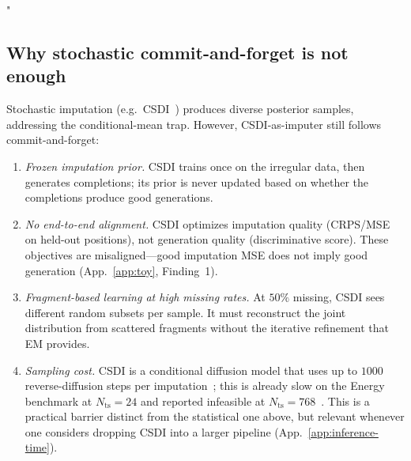 "\documentclass{article}
\theoremstyle{plain}
\theoremstyle{definition}
\theoremstyle{remark}
\newcommand{\Nts}{N_{\mathrm{ts}}}
\begin{document}
\subsection{Why stochastic commit-and-forget is not enough}
\label{app:frozen-stochastic}

Stochastic imputation (e.g.\ CSDI~\citep{tashiro2021csdi}) produces diverse posterior samples, addressing the conditional-mean trap. However, CSDI-as-imputer still follows commit-and-forget:
\begin{enumerate}
\setlength{\itemsep}{0pt}
\item \emph{Frozen imputation prior.} CSDI trains once on the irregular data, then generates completions; its prior is never updated based on whether the completions produce good generations.
\item \emph{No end-to-end alignment.} CSDI optimizes imputation quality (CRPS/MSE on held-out positions), not generation quality (discriminative score). These objectives are misaligned---good imputation MSE does not imply good generation (App.~\ref{app:toy}, Finding~1).
\item \emph{Fragment-based learning at high missing rates.} At $50\%$ missing, CSDI sees different random subsets per sample. It must reconstruct the joint distribution from scattered fragments without the iterative refinement that EM provides.
\item \emph{Sampling cost.} CSDI is a conditional diffusion model that uses up to $1000$ reverse-diffusion steps per imputation~\citep{tashiro2021csdi}; this is already slow on the Energy benchmark at $\Nts{=}24$ and reported infeasible at $\Nts{=}768$~\citep{fadlon2025imageni2r}. This is a practical barrier distinct from the statistical one above, but relevant whenever one considers dropping CSDI into a larger pipeline (App.~\ref{app:inference-time}).
\end{enumerate}
\end{document}
